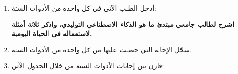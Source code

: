 \documentclass[a4paper]{article}
\begin{document}
\begin{enumerate}


\item أدخل الطلب الآتي في كل واحدة من الأدوات الستة:

\begin{center}

\textbf{
اشرح لطالب جامعي مبتدئ ما هو الذكاء الاصطناعي التوليدي،
واذكر ثلاثة أمثلة لاستعماله في الحياة اليومية.
}

\end{center}


\item سجّل الإجابة التي حصلت عليها من كل واحدة
من الأدوات الستة.


\item قارن بين إجابات الأدوات الستة من خلال الجدول الآتي:

\begin{center}

\end{center}
\end{enumerate}
\end{document}
